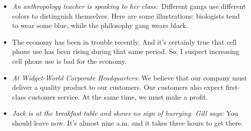 \begin{itemize}

\item \textit{An anthropology teacher is speaking to her class:~}Different gangs use different colors to distinguish themselves. Here are some illustrations: biologists tend to wear some blue, while the philosophy gang wears black.


\item The economy has been in trouble recently. And it's certainly true that cell phone use has been rising during that same period. So, I suspect increasing cell phone use is bad for the economy.




\item \textit{At Widget-World Corporate Headquarters:} We believe that our company must deliver a quality product to our customers. Our customers also expect first-class customer service. At the same time, we must make a profit.


\item \textit{Jack is at the breakfast table and shows no sign of hurrying. Gill says:} You should leave now. It's almost nine a.m. and it takes three hours to get there.




\end{itemize}
